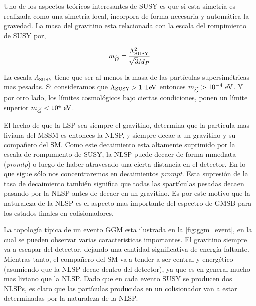 Uno de los aspectos teóricos interesantes de SUSY es que si esta simetría es
realizada como una simetría local, incorpora de forma necesaria y automática la
gravedad.
La masa del gravitino esta relacionada con la escala del rompimiento de SUSY por,

\begin{equation}
  m_{\widetilde{G}} = \frac{\Lambda^2_{\text{SUSY}}}{\sqrt{3}M_P}
\end{equation}

La escala $\Lambda_{\text{SUSY}}$ tiene que ser al menos la masa de las
partículas supersimétricas mas pesadas. Si consideramos que
$\Lambda_{\text{SUSY}} > 1 \tev$ entonces $m_{\gravino} > 10^{-4} \eV$.
Y por otro lado, los límites cosmológicos \cite{PhysRevLett.48.223,Moroi:1993mb}
bajo ciertas condiciones, ponen un límite superior $m_{\gravino} < 10^4 \eV$.%

El hecho de que la LSP sea siempre el gravitino, determina que la partícula mas
liviana del MSSM es entonces la NLSP, y siempre decae a un gravitino y su
compañero del SM. Como este decaimiento esta altamente suprimido por la escala
de rompimiento de SUSY, la NLSP puede decaer de forma inmediata (\emph{promtp}) o luego de haber
atravesado una cierta distancia en el detector. En lo que sigue sólo nos concentraremos
en decaimientos \emph{prompt}.
Esta supresión de la tasa de decaimiento también significa que todas las
spartículas pesadas decaen pasando por la NLSP antes de decaer en un gravitino.
Es por este motivo que la naturaleza de la NLSP es el aspecto mas importante del
espectro de GMSB para los estados finales en colisionadores.


La topología típica de un evento GGM esta ilustrada en la
\cref{fig:ggm_event}, en la cual se pueden observar varias caracteristicas
importantes. El gravitino siempre va a escapar del detector, dejando una
cantidad significativa de energía faltante. Mientras tanto, el compañero del SM
va a tender a ser central y energético (asumiendo que la NLSP decae dentro del
detector), ya que es en general mucho mas liviano que la NLSP. Dado que en cada
evento SUSY se producen dos NLSPs, es claro que las partículas producidas en un
colisionador van a estar determinadas por la naturaleza de la NLSP.

